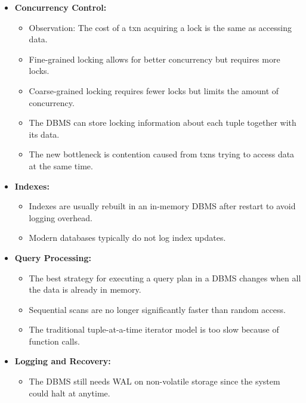 \documentclass[11pt]{article}
\begin{document}
\begin{itemize}
    \item \textbf{Concurrency Control:}
    \begin{itemize}
        \item
        Observation: The cost of a txn acquiring a lock is the same as accessing data.
        
        \item
        Fine-grained locking allows for better concurrency but requires more locks.
        
        \item
        Coarse-grained locking requires fewer locks but limits the amount of concurrency.
        
        \item
        The DBMS can store locking information about each tuple together with its data.
        
        \item
        The new bottleneck is contention caused from txns trying to access data at the 
        same time.
    \end{itemize}
    
    \item \textbf{Indexes:}
    \begin{itemize}
        \item
        Indexes are usually rebuilt in an in-memory DBMS after restart to avoid logging overhead.
        
        \item
        Modern databases typically do not log index updates.
    \end{itemize}
    
    \item \textbf{Query Processing:}
    \begin{itemize}
        \item
        The best strategy for executing a query plan in a DBMS changes when all the data is 
        already in memory.
        
        \item
        Sequential scans are no longer significantly faster than random access.
        
        \item
        The traditional tuple-at-a-time iterator model is too slow because of function calls.
    \end{itemize}
    
    \item \textbf{Logging and Recovery:}
    \begin{itemize}
        \item
        The DBMS still needs WAL on non-volatile storage since the system could halt at anytime.
        

\end{itemize}
\end{itemize}
\end{document}
